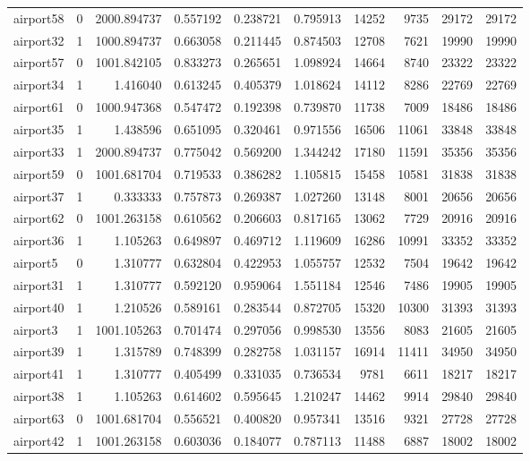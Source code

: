 \begin{longtable}{|l|r|r|r|r|r|r|r|r|r|}
airport58 & 0 & 2000.894737 & 0.557192 & 0.238721 & 0.795913 & 14252 & 9735 & 29172 & 29172 \\
airport32 & 1 & 1000.894737 & 0.663058 & 0.211445 & 0.874503 & 12708 & 7621 & 19990 & 19990 \\
airport57 & 0 & 1001.842105 & 0.833273 & 0.265651 & 1.098924 & 14664 & 8740 & 23322 & 23322 \\
airport34 & 1 & 1.416040 & 0.613245 & 0.405379 & 1.018624 & 14112 & 8286 & 22769 & 22769 \\
airport61 & 0 & 1000.947368 & 0.547472 & 0.192398 & 0.739870 & 11738 & 7009 & 18486 & 18486 \\
airport35 & 1 & 1.438596 & 0.651095 & 0.320461 & 0.971556 & 16506 & 11061 & 33848 & 33848 \\
airport33 & 1 & 2000.894737 & 0.775042 & 0.569200 & 1.344242 & 17180 & 11591 & 35356 & 35356 \\
airport59 & 0 & 1001.681704 & 0.719533 & 0.386282 & 1.105815 & 15458 & 10581 & 31838 & 31838 \\
airport37 & 1 & 0.333333 & 0.757873 & 0.269387 & 1.027260 & 13148 & 8001 & 20656 & 20656 \\
airport62 & 0 & 1001.263158 & 0.610562 & 0.206603 & 0.817165 & 13062 & 7729 & 20916 & 20916 \\
airport36 & 1 & 1.105263 & 0.649897 & 0.469712 & 1.119609 & 16286 & 10991 & 33352 & 33352 \\
airport5 & 0 & 1.310777 & 0.632804 & 0.422953 & 1.055757 & 12532 & 7504 & 19642 & 19642 \\
airport31 & 1 & 1.310777 & 0.592120 & 0.959064 & 1.551184 & 12546 & 7486 & 19905 & 19905 \\
airport40 & 1 & 1.210526 & 0.589161 & 0.283544 & 0.872705 & 15320 & 10300 & 31393 & 31393 \\
airport3 & 1 & 1001.105263 & 0.701474 & 0.297056 & 0.998530 & 13556 & 8083 & 21605 & 21605 \\
airport39 & 1 & 1.315789 & 0.748399 & 0.282758 & 1.031157 & 16914 & 11411 & 34950 & 34950 \\
airport41 & 1 & 1.310777 & 0.405499 & 0.331035 & 0.736534 & 9781 & 6611 & 18217 & 18217 \\
airport38 & 1 & 1.105263 & 0.614602 & 0.595645 & 1.210247 & 14462 & 9914 & 29840 & 29840 \\
airport63 & 0 & 1001.681704 & 0.556521 & 0.400820 & 0.957341 & 13516 & 9321 & 27728 & 27728 \\
airport42 & 1 & 1001.263158 & 0.603036 & 0.184077 & 0.787113 & 11488 & 6887 & 18002 & 18002 \\

\end{longtable}
